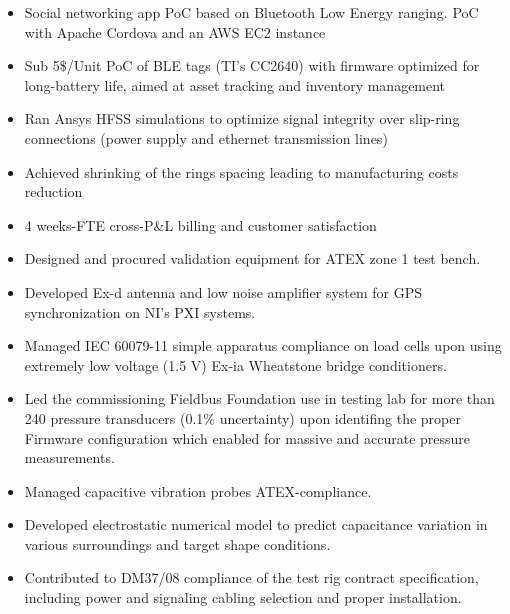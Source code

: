 \documentclass[9pt,a4paper,ragged2e,withhyper]{altacv} %
\begin{document}
\begin{paracol}{2}
\begin{itemize}
\item Social networking app PoC based on Bluetooth Low Energy ranging. PoC with Apache
Cordova and an AWS EC2 instance
\end{itemize}
\divider

\begin{itemize}
\item Sub 5\$/Unit PoC of BLE tags (TI's CC2640) with firmware optimized for long-battery
life, aimed at asset tracking and inventory management
\end{itemize}
\divider

\begin{itemize}
\item Ran Ansys HFSS simulations to optimize signal integrity over slip-ring connections
(power supply and ethernet transmission lines) 
\item Achieved shrinking of the rings spacing leading to manufacturing costs reduction
\item 4 weeks-FTE cross-P\&L billing and customer satisfaction
\end{itemize}
\divider

\begin{itemize}
\item Designed and procured validation equipment for ATEX zone 1 test bench. 
\item Developed Ex-d antenna and low noise amplifier system for GPS synchronization on NI's PXI systems. 
\item Managed IEC 60079-11 simple apparatus compliance on load cells upon using
extremely low voltage (1.5 V) Ex-ia Wheatstone bridge conditioners.
\end{itemize}
\divider

\begin{itemize}
\item Led the commissioning Fieldbus Foundation use in testing lab for more than 240 pressure transducers (0.1\% uncertainty) 
upon identifing the proper Firmware configuration which enabled for massive and accurate pressure measurements.
\item Managed capacitive vibration probes ATEX-compliance. 
\item Developed electrostatic numerical model to predict capacitance variation in various surroundings and target shape conditions. 
\item Contributed to DM37/08 compliance of the test rig contract specification, including power and signaling cabling selection and proper installation.
\end{itemize}
\divider


\end{paracol}
\end{document}
